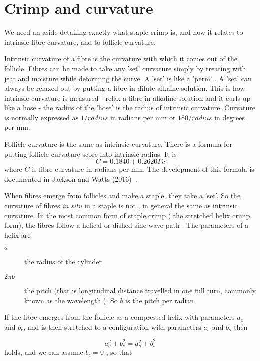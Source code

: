 \documentclass{article}
\begin{document}
\section{Crimp and curvature}
We need an aside detailing exactly what staple crimp is, and how it relates to intrinsic fibre curvature, and to follicle curvature.

Intrinsic curvature of a fibre is the curvature with which it comes out of the follicle. Fibres can be made to take any 'set' curvature simply by treating with jeat and moisture while deforming the curve. A 'set' is like a 'perm' . A 'set' can always be relaxed out by putting a fibre in dilute alkaine solution. This is how intrinsic curvature is measured - relax a fibre in alkaline solution and it curls up like a hose - the radius of the 'hose' is the radius of intrinsic curvature. Curvature is normally expressed as $1/radius$ in radians per mm or $180/radius$ in degrees per mm.

Follicle curvature is the same as intrinsic curvature. There is a formula for putting follicle curvature score into intrinsic radius. It is 
\begin{equation}
\label{eqn:in-follicle}
C = 0.1840 + 0.2620 Fc
\end{equation}
where $C$ is fibre curvature in radians per mm.
The development of this formula is documented  in Jackson and Watts (2016)~\cite{jackson-2016}.

When fibres emerge from follicles and make a staple, they take a 'set'. So the curvature of fibres {\em in situ} in a staple is not , in general the same as intrinsic curvature. In the most common form of staple crimp ( the stretched helix crimp form),   the fibres follow a helical or dished sine wave path . The parameters of a helix are
\begin{description}
\item[$a$] the radius of the cylinder
\item[$2\pi b$] the pitch (that is longitudinal distance travelled in one full turn, commonly known as the wavelength ). So $b$ is the pitch per radian
\end{description}
If the fibre   emerges from the follicle as a  compressed helix with parameters $a_{c}$ and $b_{c}$, and is then stretched to a configuration with parameters $a_{s}$ and $b_{s}$ then 

\begin{displaymath}
a_{c}^{2} + b_{c}^{2}  =  a_{s}^{2} + b_{s}^{2}
\end{displaymath}
holds, and we can assume  $b_{c} = 0$ , so that 
\end{document}
